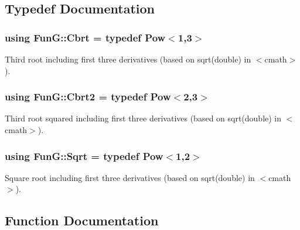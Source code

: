 \subsection{Typedef Documentation}
\hypertarget{group__CMathGroup_ga2e4363ad8400e1c8431c10de2152ec2b}{}
\subsubsection[{Cbrt}]{\setlength{\rightskip}{0pt plus 5cm}using {\bf Fun\+G\+::\+Cbrt} = typedef Pow$<$1,3$>$}\label{group__CMathGroup_ga2e4363ad8400e1c8431c10de2152ec2b}


Third root including first three derivatives (based on sqrt(double) in $<$cmath$>$). 

\hypertarget{group__CMathGroup_ga9bcbef859d7ffd0d6570d69e1bd8503a}{}
\subsubsection[{Cbrt2}]{\setlength{\rightskip}{0pt plus 5cm}using {\bf Fun\+G\+::\+Cbrt2} = typedef Pow$<$2,3$>$}\label{group__CMathGroup_ga9bcbef859d7ffd0d6570d69e1bd8503a}


Third root squared including first three derivatives (based on sqrt(double) in $<$cmath$>$). 

\hypertarget{group__CMathGroup_gaca80e773d5886f47cd49dc19b130263f}{}
\subsubsection[{Sqrt}]{\setlength{\rightskip}{0pt plus 5cm}using {\bf Fun\+G\+::\+Sqrt} = typedef Pow$<$1,2$>$}\label{group__CMathGroup_gaca80e773d5886f47cd49dc19b130263f}


Square root including first three derivatives (based on sqrt(double) in $<$cmath$>$). 



\subsection{Function Documentation}
\hypertarget{group__CMathGroup_gad26443b289325876cffdaadfca770d51}{}

